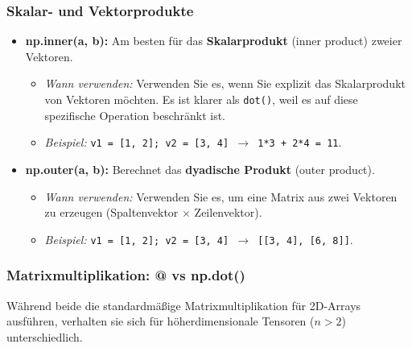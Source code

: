 \subsubsection{Skalar- und Vektorprodukte}
\begin{itemize}
    \item \textbf{np.inner(a, b):} Am besten für das \textbf{Skalarprodukt} (inner product) zweier Vektoren. 
    \begin{itemize}
        \item \textit{Wann verwenden:} Verwenden Sie es, wenn Sie explizit das Skalarprodukt von Vektoren möchten. Es ist klarer als \texttt{dot()}, weil es auf diese spezifische Operation beschränkt ist.
        \item \textit{Beispiel:} \texttt{v1 = [1, 2]; v2 = [3, 4] $\to$ 1*3 + 2*4 = 11}.
    \end{itemize}
    
    \item \textbf{np.outer(a, b):} Berechnet das \textbf{dyadische Produkt} (outer product).
    \begin{itemize}
        \item \textit{Wann verwenden:} Verwenden Sie es, um eine Matrix aus zwei Vektoren zu erzeugen (Spaltenvektor $\times$ Zeilenvektor).
        \item \textit{Beispiel:} \texttt{v1 = [1, 2]; v2 = [3, 4] $\to$ [[3, 4], [6, 8]]}.
    \end{itemize}
\end{itemize}

\subsubsection{Matrixmultiplikation: @ vs np.dot()}
Während beide die standardmäßige Matrixmultiplikation für 2D-Arrays ausführen, verhalten sie sich für höherdimensionale Tensoren ($n > 2$) unterschiedlich.

